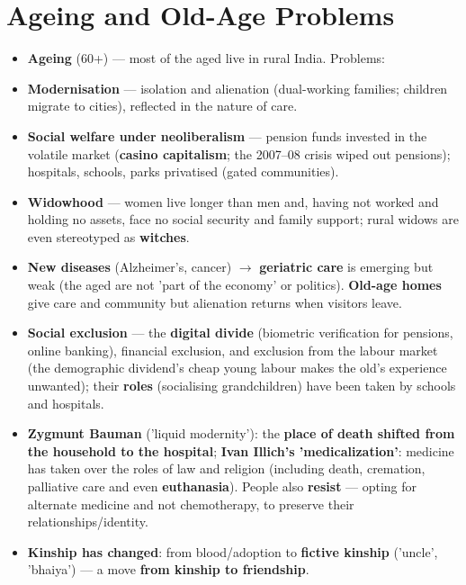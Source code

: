 \section{Ageing and Old-Age Problems}

\begin{KeyConcept}
\begin{itemize}
\item \textbf{Ageing} (60+) --- most of the aged live in rural India. Problems:
\item \textbf{Modernisation} --- isolation and alienation (dual-working families; children migrate to cities), reflected in the nature of care.
\item \textbf{Social welfare under neoliberalism} --- pension funds invested in the volatile market (\textbf{casino capitalism}; the 2007--08 crisis wiped out pensions); hospitals, schools, parks privatised (gated communities).
\item \textbf{Widowhood} --- women live longer than men and, having not worked and holding no assets, face no social security and family support; rural widows are even stereotyped as \textbf{witches}.
\item \textbf{New diseases} (Alzheimer's, cancer) $\rightarrow$ \textbf{geriatric care} is emerging but weak (the aged are not 'part of the economy' or politics). \textbf{Old-age homes} give care and community but alienation returns when visitors leave.
\item \textbf{Social exclusion} --- the \textbf{digital divide} (biometric verification for pensions, online banking), financial exclusion, and exclusion from the labour market (the demographic dividend's cheap young labour makes the old's experience unwanted); their \textbf{roles} (socialising grandchildren) have been taken by schools and hospitals.
\item \textbf{Zygmunt Bauman} ('liquid modernity'): the \textbf{place of death shifted from the household to the hospital}; \textbf{Ivan Illich's 'medicalization'}: medicine has taken over the roles of law and religion (including death, cremation, palliative care and even \textbf{euthanasia}). People also \textbf{resist} --- opting for alternate medicine and not chemotherapy, to preserve their relationships/identity.
\item \textbf{Kinship has changed}: from blood/adoption to \textbf{fictive kinship} ('uncle', 'bhaiya') --- a move \textbf{from kinship to friendship}.
\end{itemize}
\end{KeyConcept}

